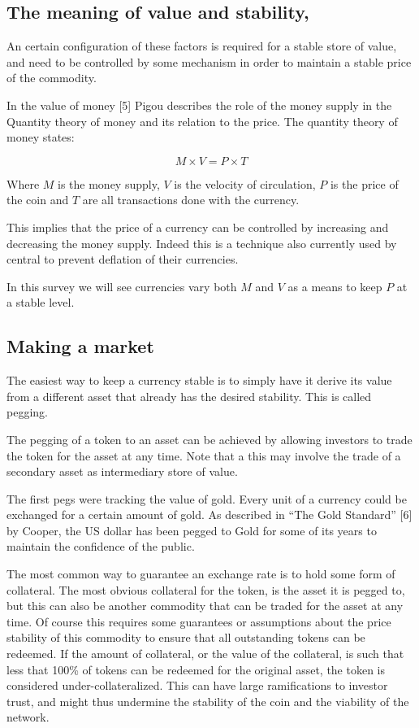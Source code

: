 \documentclass[english,]{IEEEtran}
\begin{document}
\subsection{The meaning of value and
stability,}\label{the-meaning-of-value-and-stability}

An certain configuration of these factors is required for a stable store
of value, and need to be controlled by some mechanism in order to
maintain a stable price of the commodity.

In the value of money {[}5{]} Pigou describes the role of the money
supply in the Quantity theory of money and its relation to the price.
The quantity theory of money states:

\[ M \times V = P \times T \]

Where \(M\) is the money supply, \(V\) is the velocity of circulation,
\(P\) is the price of the coin and \(T\) are all transactions done with
the currency.

This implies that the price of a currency can be controlled by
increasing and decreasing the money supply. Indeed this is a technique
also currently used by central to prevent deflation of their currencies.

In this survey we will see currencies vary both \(M\) and \(V\) as a
means to keep \(P\) at a stable level.

\subsection{Making a market}\label{making-a-market}

The easiest way to keep a currency stable is to simply have it derive
its value from a different asset that already has the desired stability.
This is called pegging.

The pegging of a token to an asset can be achieved by allowing investors
to trade the token for the asset at any time. Note that a this may
involve the trade of a secondary asset as intermediary store of value.

The first pegs were tracking the value of gold. Every unit of a currency
could be exchanged for a certain amount of gold. As described in ``The
Gold Standard'' {[}6{]} by Cooper, the US dollar has been pegged to Gold
for some of its years to maintain the confidence of the public.

The most common way to guarantee an exchange rate is to hold some form
of collateral. The most obvious collateral for the token, is the asset
it is pegged to, but this can also be another commodity that can be
traded for the asset at any time. Of course this requires some
guarantees or assumptions about the price stability of this commodity to
ensure that all outstanding tokens can be redeemed. If the amount of
collateral, or the value of the collateral, is such that less that 100\%
of tokens can be redeemed for the original asset, the token is
considered under-collateralized. This can have large ramifications to
investor trust, and might thus undermine the stability of the coin and
the viability of the network.
\end{document}
